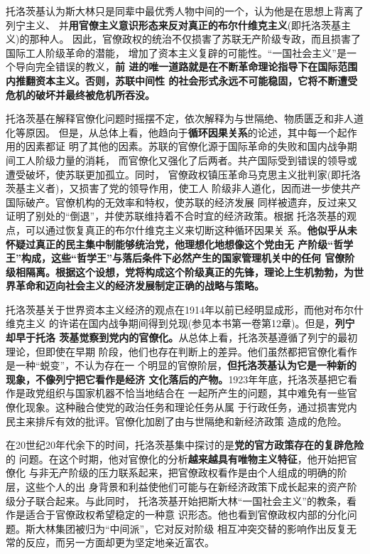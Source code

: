 托洛茨基认为斯大林只是同辈中最优秀人物中间的一个，认为他是在思想上背离了列宁主义、
并\textbf{用官僚主义意识形态来反对真正的布尔什维克主义}(即托洛茨基主义)的那种人。
因此，官僚政权的统治不仅损害了苏联无产阶级专政，而且损害了国际工人阶级革命的潜能，
增加了资本主义复辟的可能性。“一国社会主义”是一个导向完全错误的教义，\textbf{前
  进的唯一道路就是在不断革命理论指导下在国际范围内推翻资本主义。否则，苏联中间性
  的社会形式永远不可能稳固，它将不断遭受危机的破坏并最终被危机所吞没。}

托洛茨基在解释官僚化问题时摇摆不定，依次解释为与世隔绝、物质匮乏和非人道化等原因。
但是，从总体上看，他趋向于\textbf{循环因果关系}的论述，其中每一个起作用的因素都证
明了其他的因素。苏联的官僚化源于国际革命的失败和国内战争期间工人阶级力量的消耗，
而官僚化又强化了后两者。共产国际受到错误的领导或遭受破坏，使苏联更加孤立。同时，
官僚政权镇压革命马克思主义批判家(即托洛茨基主义者)，又损害了党的领导作用，使工人
阶级非人道化，因而进一步使共产国际破产。官僚机构的无效率和特权，使苏联的经济发展
同样被遗弃，反过来又证明了别处的“倒退”，并使苏联维持着不合时宜的经济政策。根据
托洛茨基的观点，可以通过恢复真正的布尔什维克主义来切断这种循环因果关
系。\textbf{他似乎从未怀疑过真正的民主集中制能够统治党，他理想化地想像这个党由无
  产阶级“哲学王”构成，这些“哲学王”与落后条件下必然产生的国家管理机关中的任何
  官僚阶级相隔离。根据这个设想，党将构成这个阶级真正的先锋，理论上生机勃勃，为世
  界革命和迈向社会主义的经济发展制定正确的战略与策略。}

托洛茨基关于世界资本主义经济的观点在1914年以前已经明显成形，而他对布尔什维克主义
的许诺在国内战争期间得到兑现(参见本书第一卷第12章)。但是，\textbf{列宁却早于托洛
  茨基觉察到党内的官僚化。}从总体上看，托洛茨基遵循了列宁的最初理论，但即使在早期
阶段，他们也存在判断上的差异。他们虽然都把官僚化看作是一种“蜕变”，不认为存在一
个明显的官僚阶层，\textbf{但托洛茨基认为它是一种新的现象，不像列宁把它看作是经济
  文化落后的产物。}1923年年底，托洛茨基把它看作是政党组织与国家机器不恰当地结合在
一起所产生的问题，其中难免有一些官僚化现象。这种融合使党的政治任务和理论任务从属
于行政任务，通过损害党内民主来排斥有效的批评。官僚化加剧了由与世隔绝和新经济政策
造成的危险。

在20世纪20年代余下的时间，托洛茨基集中探讨的是\textbf{党的官方政策存在的复辟危险}的
问题。在这个时期，他对官僚化的分析\textbf{越来越具有唯物主义特征}，他开始把官僚化
与非无产阶级的压力联系起来，把官僚政权看作是由个人组成的明确的阶层，这些个人的出
身背景和利益使他们可能与在新经济政策下成长起来的资产阶级分子联合起来。与此同时，
托洛茨基开始把斯大林“一国社会主义”的教条，看作是适合于官僚政权希望稳定的一种意
识形态。他也看到官僚政权内部的分化问题。斯大林集团被归为“中间派”，它对反对阶级
相互冲突交替的影响作出反复无常的反应，而另一方面却更为坚定地亲近富农。

